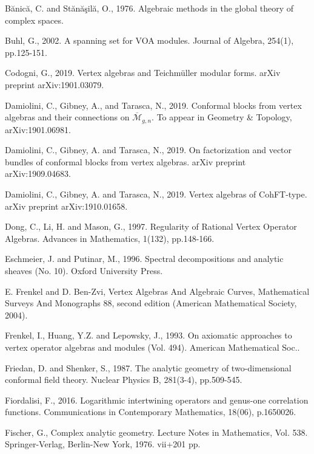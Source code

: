 \documentclass[12pt,a4paper,notitlepage]{article}
\theoremstyle{definition}
\theoremstyle{plain}
\newcommand{\mc}{\mathcal}
\newcommand{\ovl}{\overline}
\numberwithin{equation}{section}
\begin{document}
\begin{thebibliography}{999999}
		Bănică, C. and Stănăşilă, O., 1976. Algebraic methods in the global theory of complex spaces.
		
		Buhl, G., 2002. A spanning set for VOA modules. Journal of Algebra, 254(1), pp.125-151.
		
Codogni, G., 2019. Vertex algebras and Teichm\"uller modular forms. arXiv preprint arXiv:1901.03079.		
		
	Damiolini, C., Gibney, A., and Tarasca, N., 2019. Conformal blocks from vertex algebras and their connections on $\ovl{\mc M}_{g,n}$.  To appear in Geometry \& Topology, arXiv:1901.06981.
	
Damiolini, C., Gibney, A. and Tarasca, N., 2019. On factorization and vector bundles of conformal blocks from vertex algebras. arXiv preprint arXiv:1909.04683.

Damiolini, C., Gibney, A. and Tarasca, N., 2019. Vertex algebras of CohFT-type. arXiv preprint arXiv:1910.01658.
		
Dong, C., Li, H. and Mason, G., 1997. Regularity of Rational Vertex Operator Algebras. Advances in Mathematics, 1(132), pp.148-166.
		
		Eschmeier, J. and Putinar, M., 1996. Spectral decompositions and analytic sheaves (No. 10). Oxford University Press.
		
		E. Frenkel and D. Ben-Zvi, Vertex Algebras And Algebraic Curves, Mathematical Surveys And Monographs 88, second edition (American Mathematical Society, 2004).
		
		Frenkel, I., Huang, Y.Z. and Lepowsky, J., 1993. On axiomatic approaches to vertex operator algebras and modules (Vol. 494). American Mathematical Soc..
		
Friedan, D. and Shenker, S., 1987. The analytic geometry of two-dimensional conformal field theory. Nuclear Physics B, 281(3-4), pp.509-545.		
		
Fiordalisi, F., 2016. Logarithmic intertwining operators and genus-one correlation functions. Communications in Contemporary Mathematics, 18(06), p.1650026.		
		
		Fischer, G., Complex analytic geometry. Lecture Notes in Mathematics, Vol. 538. Springer-Verlag, Berlin-New York, 1976. vii+201 pp.
		

\end{thebibliography}
\end{document}
